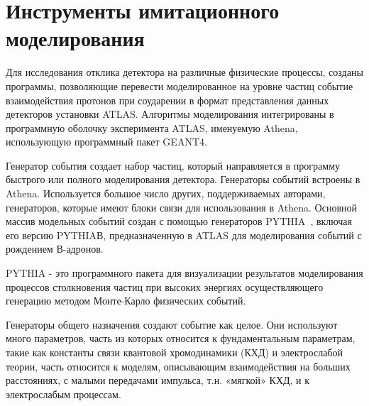 \section{Инструменты имитационного моделирования}

Для исследования отклика детектора на различные физические процессы, созданы программы, позволяющие перевести моделированное на уровне частиц событие  взаимодействия протонов при соударении в формат представления данных детекторов установки ATLAS. Алгоритмы моделирования интегрированы в программную оболочку эксперимента  ATLAS, именуемую Athena, использующую программный пакет GEANT4.

Генератор события создает набор частиц, который направляется в программу быстрого или полного моделирования детектора. Генераторы событий встроены в Athena. Используется большое число других, поддерживаемых авторами, генераторов, которые имеют блоки связи для использования в Athena. Основной массив модельных событий создан с помощью генераторов PYTHIA~\cite{2part-pythia-all}, включая его версию PYTHIAВ,  предназначенную в  ATLAS для моделирования событий с рождением В-адронов.

PYTHIA - это программного пакета для визуализации результатов моделирования процессов столкновения частиц при высоких энергиях осуществляющего генерацию методом Монте-Карло физических событий.

Генераторы общего назначения создают событие как целое. Они используют много параметров, часть из которых относится к фундаментальным параметрам, такие как константы связи квантовой хромодинамики (КХД) и электрослабой теории, часть относится к моделям, описывающим взаимодействия на больших расстояниях, с малыми передачами импульса, т.н. «мягкой» КХД, и к электрослабым процессам.

